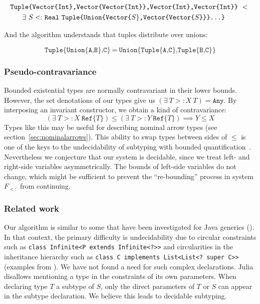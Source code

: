 \vspace{-3ex}
\begin{singlespace}
\begin{align*}
&\texttt{Tuple\{Vector\{Int\},Vector\{Vector\{Int\}\},Vector\{Int\},Vector\{Int\}\}}\ <\ \\
&\hspace{4ex}\exists\ S<:\texttt{Real}\ \texttt{Tuple\{Union\{Vector\{}S\}\texttt{,Vector\{Vector\{}S\texttt{\}\}\}...\}}
\end{align*}
\end{singlespace}

\noindent
And the algorithm understands that tuples distribute over unions:

\vspace{-3ex}
\[
\texttt{Tuple\{Union\{A,B\},C\}}\ =\ \texttt{Union\{Tuple\{A,C\},Tuple\{B,C\}\}}
\]

\subsubsection{Pseudo-contravariance}

Bounded existential types are normally contravariant in their lower bounds.
However, the set denotations of our types give us
$(\exists\ T>:X\ T) = \texttt{Any}$.
By interposing an invariant constructor, we obtain a kind of contravariance:
\[
(\exists\ T>:X\ \texttt{Ref}\{T\}) \leq (\exists\ T>:Y\ \texttt{Ref}\{T\}) \implies Y\leq X
\]
\noindent
Types like this may be useful for describing nominal arrow types
(see section~\ref{sec:nominalarrows}).
This ability to swap types between sides of $\leq$ is one of the keys to
the undecidability of subtyping with bounded quantification~\cite{Pierce1994131}.
Nevertheless we conjecture that our system is decidable, since we treat
left- and right-side variables asymmetrically.
The bounds of left-side variables do not change, which might be sufficient to
prevent the ``re-bounding'' process in system $F_{<:}$ from continuing.


\subsubsection{Related work}

Our algorithm is similar to some that have been investigated for Java
generics (\cite{wehr2008subtyping, Cameron:2009:SWE:1557898.1557902,
Tate:2011:TWJ:1993316.1993570}).
In that context, the primary difficulty is undecidability due to
circular constraints such as \texttt{class Infinite<P extends Infinite<?>>}
and circularities in the inheritance hierarchy such as
\texttt{class C implements List<List<?\ super C>>} (examples from
\cite{Tate:2011:TWJ:1993316.1993570}).
We have not found a need for such complex declarations.
Julia disallows mentioning a type in the constraints of its own parameters.
When declaring type $T$ a subtype of $S$, only the direct parameters of
$T$ or $S$ can appear in the subtype declaration.
We believe this leads to decidable subtyping.

